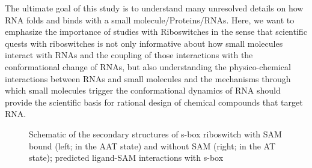 \documentclass[a4paper,10pt]{article}
\begin{document}
The ultimate goal of this study is to understand many unresolved details on how RNA folds and binds with a small molecule/Proteins/RNAs.  Here, we want to emphasize the importance of studies with Riboswitches in the sense that scientific quests with riboswitches is not only informative about how small molecules 
interact with RNAs and the coupling of those interactions with the conformational change of RNAs, but also understanding the physico-chemical interactions between RNAs and small molecules and
the mechanisms through which small molecules trigger the conformational dynamics of RNA should 
provide the scientific basis for rational design of chemical compounds that target RNA.

\begin{figure}
   \hspace{0.05in}
\caption{Schematic of the secondary structures of s-box riboswitch with SAM bound (left; in the AAT state) and without SAM 
(right; in the AT state); predicted ligand-SAM interactions with s-box}
\end{figure}
\end{document}
